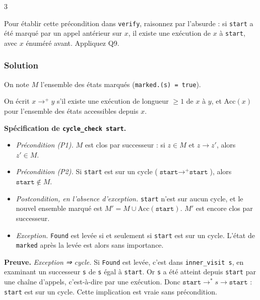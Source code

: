 \documentclass[11pt,a4paper]{article}
\providecommand{\tightlist}{\setlength{\itemsep}{0pt}\setlength{\parskip}{0pt}}
\begin{document}
\begin{indication}{3}

Pour établir cette précondition dans \texttt{verify}, raisonnez par l'absurde : si \texttt{start} a été marqué par un appel antérieur sur \(x\), il existe une exécution de \(x\) à \texttt{start}, avec \(x\) énuméré avant. Appliquez Q9.

\end{indication}

\hypertarget{solution-10}{%
\subsubsection{Solution}\label{solution-10}}

On note \(M\) l'ensemble des états marqués (\texttt{marked.(\allowbreak{}s)\allowbreak{}\ =\allowbreak{}\ true}).

On écrit \(x\to^+y\) s'il existe une exécution de longueur \(\ge1\) de \(x\) à \(y\), et \(\mathrm{Acc}(x)\) pour l'ensemble des états accessibles depuis \(x\).

\textbf{Spécification de \texttt{cycle\_check\ start}.}

\begin{itemize}
\tightlist
\item
  \emph{Précondition (P1).} \(M\) est clos par successeur : si \(z\in M\) et \(z\to z'\), alors \(z'\in M\).
\item
  \emph{Précondition (P2).} Si \texttt{start} est sur un cycle (\(\texttt{start}\to^+\texttt{start}\)), alors \(\texttt{start}\notin M\).
\item
  \emph{Postcondition, en l'absence d'exception.} \texttt{start} n'est sur aucun cycle, et le nouvel ensemble marqué est \(M'=M\cup\mathrm{Acc}(\texttt{start})\). \(M'\) est encore clos par successeur.
\item
  \emph{Exception.} \texttt{Found} est levée si et seulement si \texttt{start} est sur un cycle. L'état de \texttt{marked} après la levée est alors sans importance.
\end{itemize}

\textbf{Preuve.} \emph{Exception ⇒ cycle.} Si \texttt{Found} est levée, c'est dans \texttt{inner\_visit\ s}, en examinant un successeur \texttt{s\textquotesingle{}} de \texttt{s} égal à \texttt{start}. Or \texttt{s} a été atteint depuis \texttt{start} par une chaîne d'appels, c'est-à-dire par une exécution. Donc \(\texttt{start}\to^*s\to\texttt{start}\) : \texttt{start} est sur un cycle. Cette implication est vraie sans précondition.
\end{document}
